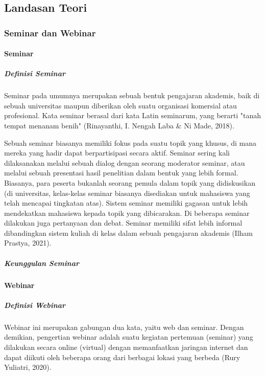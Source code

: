 \chapter{\babDua}

\section{Landasan Teori}


\subsection{Seminar dan Webinar}
\subsubsection{Seminar}
\paragraph{Definisi Seminar}
Seminar pada umumnya merupakan sebuah bentuk pengajaran akademis, baik di sebuah universitas maupun diberikan oleh suatu organisasi komersial atau profesional. Kata seminar berasal dari kata Latin seminarum, yang berarti "tanah tempat menanam benih" (Rinayanthi, I. Nengah Laba \& Ni Made, 2018).

Sebuah seminar biasanya memiliki fokus pada suatu topik yang khusus, di mana mereka yang hadir dapat berpartisipasi secara aktif. Seminar sering kali dilaksanakan melalui sebuah dialog dengan seorang moderator seminar, atau melalui sebuah presentasi hasil penelitian dalam bentuk yang lebih formal. Biasanya, para peserta bukanlah seorang pemula dalam topik yang didiskusikan (di universitas, kelas-kelas seminar biasanya disediakan untuk mahasiswa yang telah mencapai tingkatan atas). Sistem seminar memiliki gagasan untuk lebih mendekatkan mahasiswa kepada topik yang dibicarakan. Di beberapa seminar dilakukan juga pertanyaan dan debat. Seminar memiliki sifat lebih informal dibandingkan sistem kuliah di kelas dalam sebuah pengajaran akademis (Ilham Prastya, 2021).

\paragraph{Keunggulan Seminar}
\subsubsection{Webinar}
\paragraph{Definisi Webinar}
Webinar ini merupakan gabungan dua kata, yaitu web dan seminar. Dengan demikian, pengertian webinar adalah suatu kegiatan pertemuan (seminar) yang dilakukan secara online (virtual) dengan memanfaatkan jaringan internet dan dapat diikuti oleh beberapa orang dari berbagai lokasi yang berbeda (Rury Yuliatri, 2020).

